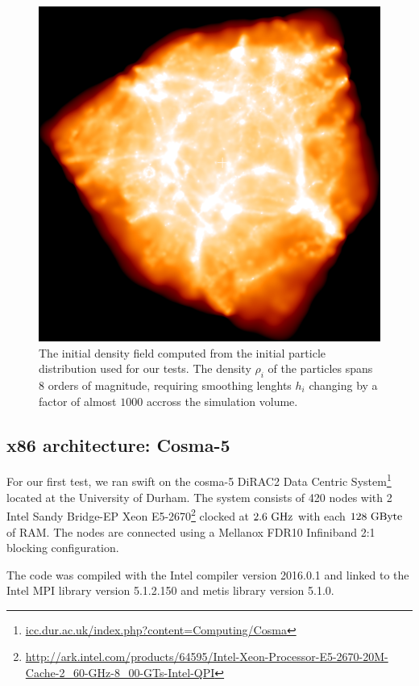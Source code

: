 \documentclass{sig-alternate-05-2015}
\newcommand{\swift}{{\sc swift}\xspace}
\begin{document}
\begin{figure}
\centering
\includegraphics[width=\columnwidth]{Figures/cosmoVolume}
\caption{The initial density field computed from the initial particle
  distribution used for our tests. The density $\rho_i$ of the particles spans 8
  orders of magnitude, requiring smoothing lenghts $h_i$ changing by a factor of
  almost $1000$ accross the simulation volume. \label{fig:ICs}}
\end{figure}  


\subsection{x86 architecture: Cosma-5}

For our first test, we ran \swift on the cosma-5 DiRAC2 Data Centric
System\footnote{\url{icc.dur.ac.uk/index.php?content=Computing/Cosma}} located
at the University of Durham. The system consists of 420 nodes with 2 Intel Sandy
Bridge-EP Xeon
E5-2670\footnote{\url{http://ark.intel.com/products/64595/Intel-Xeon-Processor-E5-2670-20M-Cache-2_60-GHz-8_00-GTs-Intel-QPI}}
clocked at $2.6~\rm{GHz}$ with each $128~\rm{GByte}$ of RAM. The nodes are
connected using a Mellanox FDR10 Infiniband 2:1 blocking configuration.

The code was compiled with the Intel compiler version \textsc{2016.0.1} and
linked to the Intel MPI library version \textsc{5.1.2.150} and metis library
version \textsc{5.1.0}.
\end{document}
